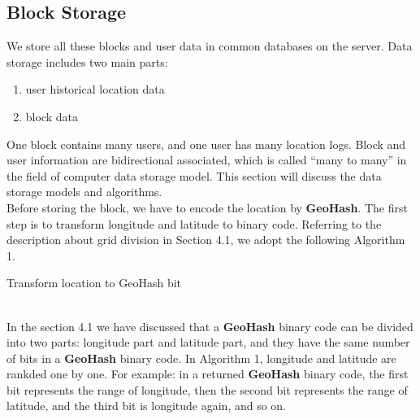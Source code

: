 \documentclass[sigplan,screen]{acmart}
\begin{document}
\subsection{Block Storage}
We store all these blocks and user data in common databases on the server.
Data storage includes two main parts:
\begin{enumerate}
	\item user historical location data
	\item block data
\end{enumerate}
One block contains many users, and one user has many location logs.
Block and user information are bidirectional associated, which is called “many to many” in the field of computer data storage model.
This section will discuss the data storage models and algorithms.
\\
Before storing the block, we have to encode the location by \textbf{GeoHash}.
The first step is to transform longitude and latitude to binary code.
Referring to the description about grid division in Section 4.1, we adopt the following Algorithm 1.
\\
\begin{algorithm}[htb]
	\caption{Transform location to GeoHash bit}
	\begin{algorithmic}[1]
		\Else
		\EndIf
		\Else
		\EndIf
		\EndWhile
		\EndFunction
	\end{algorithmic}
\end{algorithm}
\\
In the section 4.1 we have discussed that a \textbf{GeoHash} binary code can be divided into two parts: longitude part and latitude part, and they have the same number of bits in a \textbf{GeoHash} binary code.
In Algorithm 1, longitude and latitude are rankded one by one.
For example: in a returned \textbf{GeoHash} binary code, the first bit represents the range of longitude, then the second bit represents the range of latitude, and the third bit is longitude again, and so on.
\end{document}
